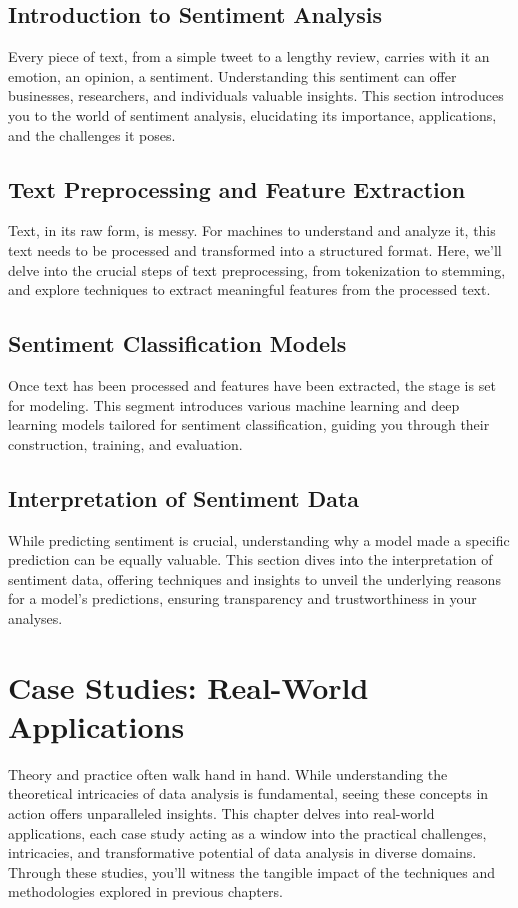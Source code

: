 \documentclass{book}
\begin{document}
\section{Introduction to Sentiment Analysis}
Every piece of text, from a simple tweet to a lengthy review, carries with it an emotion, an opinion, a sentiment. Understanding this sentiment can offer businesses, researchers, and individuals valuable insights. This section introduces you to the world of sentiment analysis, elucidating its importance, applications, and the challenges it poses.

\section{Text Preprocessing and Feature Extraction}
Text, in its raw form, is messy. For machines to understand and analyze it, this text needs to be processed and transformed into a structured format. Here, we'll delve into the crucial steps of text preprocessing, from tokenization to stemming, and explore techniques to extract meaningful features from the processed text.

\section{Sentiment Classification Models}
Once text has been processed and features have been extracted, the stage is set for modeling. This segment introduces various machine learning and deep learning models tailored for sentiment classification, guiding you through their construction, training, and evaluation.

\section{Interpretation of Sentiment Data}
While predicting sentiment is crucial, understanding why a model made a specific prediction can be equally valuable. This section dives into the interpretation of sentiment data, offering techniques and insights to unveil the underlying reasons for a model's predictions, ensuring transparency and trustworthiness in your analyses.

\chapter{Case Studies: Real-World Applications}
Theory and practice often walk hand in hand. While understanding the theoretical intricacies of data analysis is fundamental, seeing these concepts in action offers unparalleled insights. This chapter delves into real-world applications, each case study acting as a window into the practical challenges, intricacies, and transformative potential of data analysis in diverse domains. Through these studies, you'll witness the tangible impact of the techniques and methodologies explored in previous chapters.
\end{document}
